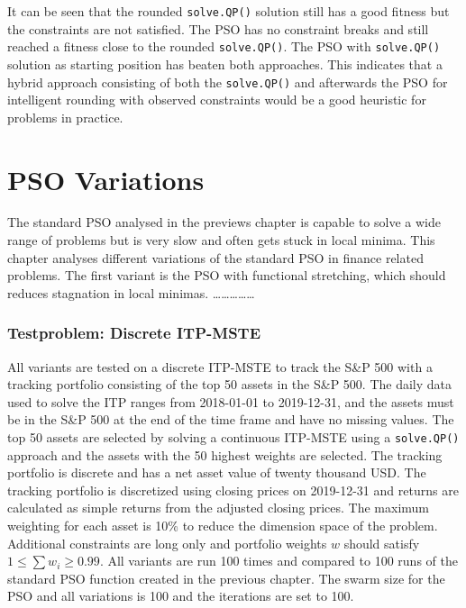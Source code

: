 \documentclass[
  oneside]{book}
\begin{document}
It can be seen that the rounded \texttt{solve.QP()} solution still has a good fitness but the constraints are not satisfied. The PSO has no constraint breaks and still reached a fitness close to the rounded \texttt{solve.QP()}. The PSO with \texttt{solve.QP()} solution as starting position has beaten both approaches. This indicates that a hybrid approach consisting of both the \texttt{solve.QP()} and afterwards the PSO for intelligent rounding with observed constraints would be a good heuristic for problems in practice.

\hypertarget{pso-variations}{%
\chapter{PSO Variations}\label{pso-variations}}

The standard PSO analysed in the previews chapter is capable to solve a wide range of problems but is very slow and often gets stuck in local minima. This chapter analyses different variations of the standard PSO in finance related problems. The first variant is the PSO with functional stretching, which should reduces stagnation in local minimas. \ldots\ldots\ldots\ldots\ldots{}

\hypertarget{testproblem-discrete-itp-mste}{%
\subsection{Testproblem: Discrete ITP-MSTE}\label{testproblem-discrete-itp-mste}}

All variants are tested on a discrete ITP-MSTE to track the S\&P 500 with a tracking portfolio consisting of the top 50 assets in the S\&P 500. The daily data used to solve the ITP ranges from 2018-01-01 to 2019-12-31, and the assets must be in the S\&P 500 at the end of the time frame and have no missing values. The top 50 assets are selected by solving a continuous ITP-MSTE using a \texttt{solve.QP()} approach and the assets with the 50 highest weights are selected. The tracking portfolio is discrete and has a net asset value of twenty thousand USD. The tracking portfolio is discretized using closing prices on 2019-12-31 and returns are calculated as simple returns from the adjusted closing prices. The maximum weighting for each asset is 10\% to reduce the dimension space of the problem. Additional constraints are long only and portfolio weights \(w\) should satisfy \(1 \leq \textstyle\sum w_i \geq 0.99\). All variants are run 100 times and compared to 100 runs of the standard PSO function created in the previous chapter. The swarm size for the PSO and all variations is 100 and the iterations are set to 100.
\end{document}

